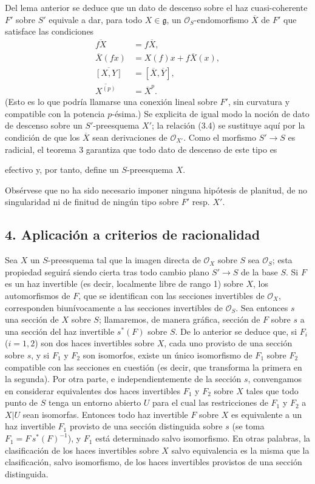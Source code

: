 \documentclass[11pt,twoside,openany]{book}
\numberwithin{equation}{section}
\newcommand{\src}[1]{%
  \phantomsection\hypertarget{src:#1}{}%
  \marginpar{\raggedleft\footnotesize\sffamily #1}%
}
\theoremstyle{plain}
\theoremstyle{definition}
\theoremstyle{remark}
\newcommand{\FgaUnitKey}{frontmatter}
\renewcommand{\src}[1]{%
  \phantomsection\hypertarget{src:\FgaUnitKey:#1}{}%
  \marginpar{\raggedleft\footnotesize\sffamily #1}%
}
\theoremstyle{plain}
\theoremstyle{definition}
\theoremstyle{remark}
\begin{document}
Del lema anterior se deduce que un dato de descenso sobre el haz
cuasi-coherente $F'$ sobre $S'$ equivale a dar, para todo $X\in\mathfrak g$, un
$\mathcal O_S$-endomorfismo $\overline X$ de $F'$ que satisface las condiciones
\begin{align}
  \overline{fX}&=f\overline X, \tag{3.7}\\
  \overline X(fx)&=X(f)x+f\overline X(x), \tag{3.8}\\
  \overline{[X,Y]}&=[\overline X,\overline Y], \tag{3.9}\\
  \overline{X^{(p)}}&=\overline X^p. \tag{3.10}
\end{align}
(Esto es lo que podría llamarse una conexión lineal sobre $F'$, sin curvatura
y compatible con la potencia $p$-ésima.) Se explicita de igual modo la noción
de dato de descenso sobre un $S'$-preesquema $X'$; la relación (3.4) se
sustituye aquí por la condición de que los $\overline X$ sean derivaciones de
$\mathcal O_{X'}$. Como el morfismo $S'\longrightarrow S$ es radicial, el
teorema 3 garantiza que todo dato de descenso de este tipo es

\src{322}
efectivo y, por tanto, define un $S$-preesquema $X$.

Obsérvese que no ha sido necesario imponer ninguna hipótesis de planitud, de no
singularidad ni de finitud de ningún tipo sobre $F'$ resp. $X'$.

\subsection*{4. Aplicación a criterios de racionalidad}

Sea $X$ un $S$-preesquema tal que la imagen directa de $\mathcal O_X$ sobre
$S$ sea $\mathcal O_S$; esta propiedad seguirá siendo cierta tras todo cambio
plano $S'\longrightarrow S$ de la base $S$. Si $F$ es un haz invertible (es
decir, localmente libre de rango 1) sobre $X$, los automorfismos de $F$, que se
identifican con las secciones invertibles de $\mathcal O_X$, corresponden
biunívocamente a las secciones invertibles de $\mathcal O_S$. Sea entonces $s$
una sección de $X$ sobre $S$; llamaremos, de manera gráfica, sección de $F$
sobre $s$ a una sección del haz invertible $s^*(F)$ sobre $S$. De lo anterior
se deduce que, si $F_i$ ($i=1,2$) son dos haces invertibles sobre $X$, cada uno
provisto de una sección sobre $s$, y si $F_1$ y $F_2$ son isomorfos, existe un
único isomorfismo de $F_1$ sobre $F_2$ compatible con las secciones en cuestión
(es decir, que transforma la primera en la segunda). Por otra parte, e
independientemente de la sección $s$, convengamos en considerar equivalentes
dos haces invertibles $F_1$ y $F_2$ sobre $X$ tales que todo punto de $S$ tenga
un entorno abierto $U$ para el cual las restricciones de $F_1$ y $F_2$ a
$X|U$ sean isomorfas. Entonces todo haz invertible $F$ sobre $X$ es equivalente
a un haz invertible $F_1$ provisto de una sección distinguida sobre $s$ (se
toma $F_1=F\,s^*(F)^{-1}$), y $F_1$ está determinado salvo isomorfismo. En
otras palabras, la clasificación de los haces invertibles sobre $X$ salvo
equivalencia es la misma que la clasificación, salvo isomorfismo, de los haces
invertibles provistos de una sección distinguida.
\end{document}
